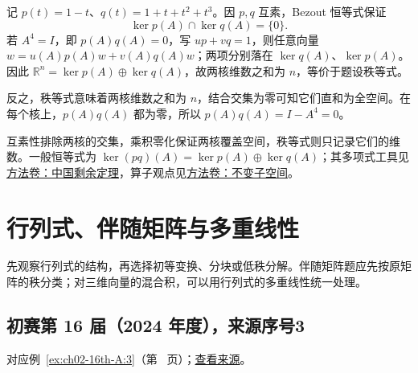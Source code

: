 \documentclass[UTF8,12pt,a4paper,fontset=fandol]{ctexart}
\begin{document}
\begin{solve}

记 $p(t)=1-t$、$q(t)=1+t+t^2+t^3$。因 $p,q$ 互素，Bezout 恒等式保证
\[
\ker p(A)\cap\ker q(A)=\{0\}.
\]
若 $A^4=I$，即 $p(A)q(A)=0$，写 $up+vq=1$，则任意向量 $w=u(A)p(A)w+v(A)q(A)w$；两项分别落在 $\ker q(A)$、$\ker p(A)$。因此
$\mathbb R^n=\ker p(A)\oplus\ker q(A)$，故两核维数之和为 $n$，等价于题设秩等式。

反之，秩等式意味着两核维数之和为 $n$，结合交集为零可知它们直和为全空间。在每个核上，$p(A)q(A)$ 都为零，所以 $p(A)q(A)=I-A^4=0$。

\end{solve}

\begin{remark}[方法与条件]

互素性排除两核的交集，乘积零化保证两核覆盖空间，秩等式则只记录它们的维数。一般恒等式为 $\ker(pq)(A)=\ker p(A)\oplus\ker q(A)$；其多项式工具见\hyperref[app:algebra-crt]{方法卷：中国剩余定理}，算子观点见\hyperref[app:linear-invariant]{方法卷：不变子空间}。

\end{remark}

\section{行列式、伴随矩阵与多重线性}

\label{sec:solutions-2}

先观察行列式的结构，再选择初等变换、分块或低秩分解。伴随矩阵题应先按原矩阵的秩分类；对三维向量的混合积，可以用行列式的多重线性统一处理。

\subsection{初赛第 16 届（2024 年度），来源序号3}\label{ans:ch02-16th-A:3}\label{pr:ch02-16th-A:3}

对应例~\ref{ex:ch02-16th-A:3}（第~\pageref{ex:ch02-16th-A:3} 页）；\href{https://github.com/lzxcr/cmc-mathematics/blob/64916fa1fdbc3e444a652eca204d5669058ee321/src/problems/preliminary/16/03.md}{查看来源}。
\end{document}
